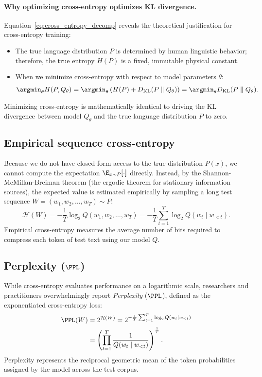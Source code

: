 \documentclass[../../main.tex]{subfiles}
\begin{document}
\paragraph{Why optimizing cross-entropy optimizes KL divergence.}
Equation~\eqref{eq:cross_entropy_decomp} reveals the theoretical justification for cross-entropy training:
\begin{itemize}
    \item The true language distribution $P$ is determined by human linguistic behavior; therefore, the true entropy $H(P)$ is a fixed, immutable physical constant.
    \item When we minimize cross-entropy with respect to model parameters $\theta$:
    \begin{equation}
    \label{eq:mle_equivalence}
    \argmin_\theta H(P, Q_\theta) = \argmin_\theta \left( H(P) + D_{\text{KL}}(P \parallel Q_\theta) \right) = \argmin_\theta D_{\text{KL}}(P \parallel Q_\theta).
    \end{equation}
\end{itemize}
Minimizing cross-entropy is mathematically identical to driving the KL divergence between model $Q_\theta$ and the true language distribution $P$ to zero.

\subsection{Empirical sequence cross-entropy}
Because we do not have closed-form access to the true distribution $P(x)$, we cannot compute the expectation $\E_{x \sim P}[\cdot]$ directly. Instead, by the Shannon-McMillan-Breiman theorem (the ergodic theorem for stationary information sources), the expected value is estimated empirically by sampling a long test sequence $W = (w_1, w_2, \dots, w_T) \sim P$:
\begin{equation}
\label{eq:empirical_cross_entropy}
\mathcal{H}(W) = - \frac{1}{T} \log_2 Q(w_1, w_2, \dots, w_T) = - \frac{1}{T} \sum_{t=1}^T \log_2 Q(w_t \mid w_{<t}).
\end{equation}
Empirical cross-entropy measures the average number of bits required to compress each token of test text using our model $Q$.

\subsection{Perplexity (\texorpdfstring{$\PPL$}{PPL})}
While cross-entropy evaluates performance on a logarithmic scale, researchers and practitioners overwhelmingly report \emph{Perplexity} ($\PPL$), defined as the exponentiated cross-entropy loss:
\begin{align}
\PPL(W) &= 2^{\mathcal{H}(W)} = 2^{-\frac{1}{T} \sum_{t=1}^T \log_2 Q(w_t \mid w_{<t})} \label{eq:ppl_base2} \\
&= \left( \prod_{t=1}^T \frac{1}{Q(w_t \mid w_{<t})} \right)^{\frac{1}{T}}. \label{eq:ppl_geometric}
\end{align}
Perplexity represents the reciprocal geometric mean of the token probabilities assigned by the model across the test corpus.
\end{document}
